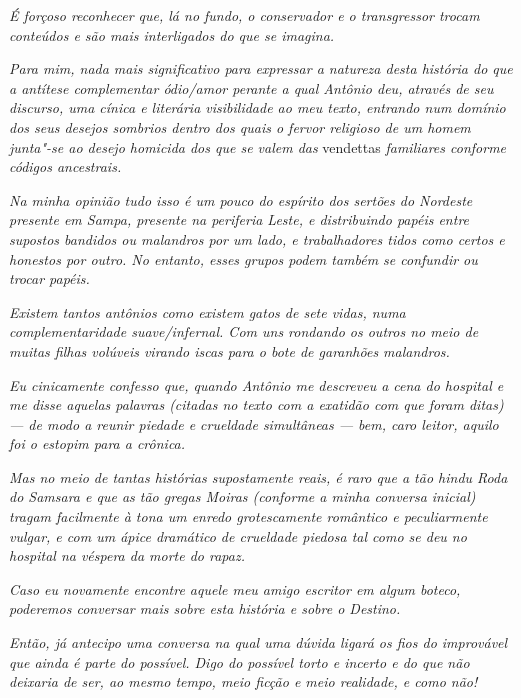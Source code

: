 \emph{É forçoso reconhecer que, lá no fundo, o conservador e o
transgressor trocam conteúdos e são mais interligados do que se
imagina.}

\emph{Para mim, nada mais significativo para expressar a natureza desta
história do que a antítese complementar ódio/amor perante a qual Antônio
deu, através de seu discurso, uma cínica e literária visibilidade ao meu
texto, entrando num domínio dos seus desejos sombrios dentro dos quais o
fervor religioso de um homem junta"-se ao desejo homicida dos que se
valem das} vendettas \emph{familiares conforme códigos ancestrais.}

\emph{Na minha opinião tudo isso é um pouco do espírito dos sertões do
Nordeste presente em Sampa, presente na periferia Leste, e distribuindo
papéis entre supostos bandidos ou malandros por um lado, e trabalhadores
tidos como certos e honestos por outro. No entanto, esses grupos
podem também se confundir ou trocar papéis.}

\emph{Existem tantos antônios como existem gatos de sete vidas, numa
complementaridade suave/infernal. Com uns rondando os outros no meio de
muitas filhas volúveis virando iscas para o bote de garanhões
malandros.}

\emph{Eu cinicamente confesso que, quando Antônio me descreveu a cena do
hospital e me disse aquelas palavras (citadas no texto com a exatidão
com que foram ditas) --- de modo a reunir piedade e crueldade
simultâneas --- bem, caro leitor, aquilo foi o estopim para a crônica.}

\emph{Mas no meio de tantas histórias supostamente reais, é raro que a
tão hindu Roda do Samsara e que as tão gregas Moiras (conforme a minha
conversa inicial) tragam facilmente à tona um enredo grotescamente
romântico e peculiarmente vulgar, e com um ápice dramático de crueldade
piedosa tal como se deu no hospital na véspera da morte do rapaz.}

\emph{Caso eu novamente encontre aquele meu amigo escritor em algum
boteco, poderemos conversar mais sobre esta história e sobre o Destino.}

\emph{Então, já antecipo uma conversa na qual uma dúvida ligará os
fios do improvável que ainda é parte do possível. Digo do possível torto
e incerto e do que não deixaria de ser, ao mesmo tempo, meio ficção e meio
realidade, e como não!~}
\endgroup